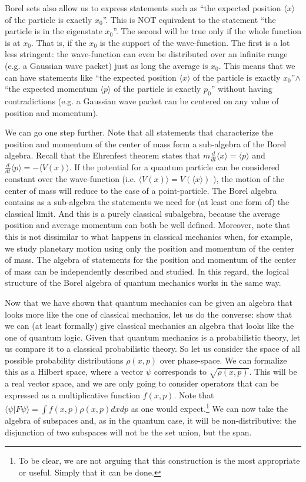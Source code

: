 \documentclass[11pt, executivepaper]{article}
\begin{document}
Borel sets also allow us to express statements such as ``the expected position $\langle x \rangle$ of the particle is exactly $x_0$''. This is NOT equivalent to the statement ``the particle is in the eigenstate $x_0$''. The second will be true only if the whole function is at $x_0$. That is, if the $x_0$ is the support of the wave-function. The first is a lot less stringent: the wave-function can even be distributed over an infinite range (e.g. a Gaussian wave packet) just as long the average is $x_0$. This means that we can have statements like ``the expected position $\langle x \rangle$ of the particle is exactly $x_0$''$\wedge$ ``the expected momentum $\langle p \rangle$ of the particle is exactly $p_0$'' without having contradictions (e.g. a Gaussian wave packet can be centered on any value of position and momentum).

We can go one step further. Note that all statements that characterize the position and momentum of the center of mass form a sub-algebra of the Borel algebra. Recall that the Ehrenfest theorem states that $m \frac{d}{dt}\langle x \rangle = \langle p \rangle$ and $ \frac{d}{dt}\langle p \rangle = - \langle V(x) \rangle$. If the potential for a quantum particle can be considered constant over the wave-function (i.e. $\langle V(x) \rangle = V(\langle x \rangle)$ ), the motion of the center of mass will reduce to the case of a point-particle. The Borel algebra contains as a sub-algebra the statements we need for (at least one form of) the classical limit. And this is a purely classical subalgebra, because the average position and average momentum can both be well defined. Moreover, note that this is not dissimilar to what happens in classical mechanics when, for example, we study planetary motion using only the position and momentum of the center of mass. The algebra of statements for the position and momentum of the center of mass can be independently described and studied. In this regard, the logical structure of the Borel algebra of quantum mechanics works in the same way.

Now that we have shown that quantum mechanics can be given an algebra that looks more like the one of classical mechanics, let us do the converse: show that we can (at least formally) give classical mechanics an algebra that looks like the one of quantum logic. Given that quantum mechanics is a probabilistic theory, let us compare it to a classical probabilistic theory. So let us consider the space of all possible probability distributions $\rho(x,p)$ over phase-space. We can formalize this as a Hilbert space, where a vector $\psi$ corresponds to $\sqrt{\rho(x,p)}$. This will be a real vector space, and we are only going to consider operators that can be expressed as a multiplicative function $f(x,p)$. Note that $\langle \psi | F \psi \rangle = \int f(x,p) \rho(x,p) dx dp$ as one would expect.\footnote{To be clear, we are not arguing that this construction is the most appropriate or useful. Simply that it can be done.}  We can now take the algebra of subspaces and, as in the quantum case, it will be non-distributive: the disjunction of two subspaces will not be the set union, but the span.
\end{document}
